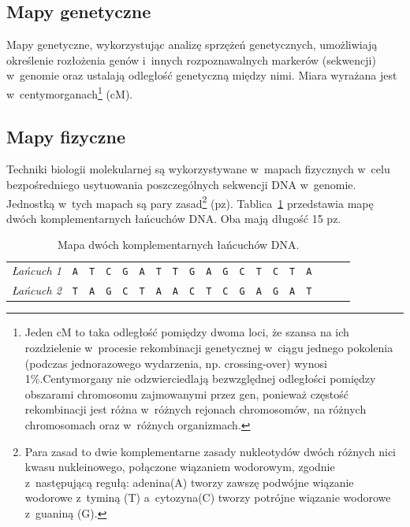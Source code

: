\documentclass[a4paper,12pt,oneside]{mwrep}  %
\begin{document}
\subsection{Mapy genetyczne}
Mapy genetyczne, wykorzystując analizę sprzężeń genetycznych, umożliwiają określenie rozłożenia genów i~innych rozpoznawalnych markerów (sekwencji) w~genomie oraz ustalają odległość genetyczną między nimi. Miara wyrażana jest w~centymorganach\footnote{Jeden cM  to taka odległość pomiędzy dwoma loci, że szansa na ich rozdzielenie w~procesie rekombinacji genetycznej w~ciągu jednego pokolenia (podczas jednorazowego wydarzenia, np. crossing-over) wynosi 1\%.Centymorgany nie odzwierciedlają bezwzględnej odległości pomiędzy obszarami chromosomu zajmowanymi przez gen, ponieważ częstość rekombinacji jest różna w~różnych rejonach chromosomów, na różnych chromosomach oraz w~różnych organizmach.%
}
(cM). %

\subsection{Mapy fizyczne}
Techniki biologii molekularnej są wykorzystywane w~mapach fizycznych w~celu bezpośredniego usytuowania poszczególnych sekwencji DNA w~genomie. Jednostką w~tych mapach są pary zasad\footnote{Para zasad to dwie komplementarne zasady nukleotydów dwóch różnych nici kwasu nukleinowego, połączone wiązaniem wodorowym, zgodnie z~następującą regułą: adenina(A) tworzy zawszę podwójne wiązanie wodorowe z~tyminą (T) a~cytozyna(C) tworzy potrójne wiązanie wodorowe z~guaniną (G). %
} (pz). Tablica~\ref{lancuchy_DNA} przedstawia mapę dwóch komplementarnych łańcuchów DNA. Oba mają długość 15 pz. %

\begin{table}[!hb]
	\begin{center}
		\begin{tabular}{c|c|c|c|c|c|c|c|c|c|c|c|c|c|c|c|c|c|c|}\cline{2-16}\emph{Łańcuch 1}&
		\verb|A|&\verb|T|&\verb|C|&\verb|G|&\verb|A|&\verb|T|&\verb|T|&\verb|G|&\verb|A|&\verb|G|&\verb|C|&\verb|T|&\verb|C|&\verb|T|&\verb|A|\\ \cline{2-16}
		\emph{Łańcuch 2} &\verb|T|&\verb|A|&\verb|G|&\verb|C|&\verb|T|&\verb|A|&\verb|A|&\verb|C|&\verb|T|&\verb|C|&\verb|G|&\verb|A|&\verb|G|&\verb|A|&\verb|T|\\ \cline{2-16}
		\end{tabular}
	\end{center}
\caption{Mapa dwóch komplementarnych łańcuchów DNA.}
\label{lancuchy_DNA}
\end{table}
\end{document}
